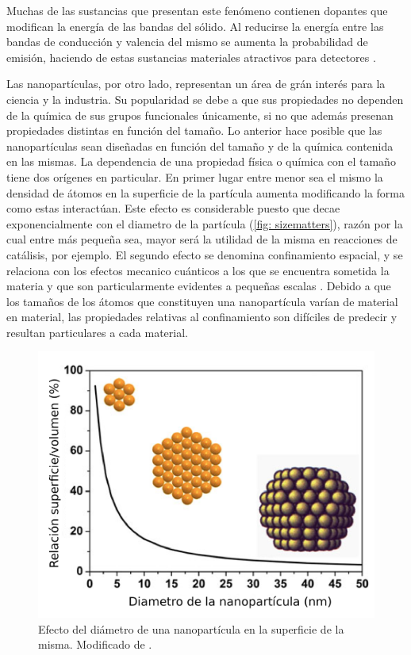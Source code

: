 \documentclass[fleqn,10pt]{SelfArx}
\begin{document}
Muchas de las sustancias que presentan este fen\'omeno contienen dopantes que modifican la energ\'ia de las bandas del s\'olido. Al reducirse la energ\'ia entre las bandas de conducci\'on y valencia del mismo se aumenta la probabilidad de emisi\'on, haciendo de estas sustancias materiales atractivos para detectores \cite{sage_humberstone_oswald_lloyd_bourhill_2001} \cite{olawale_okoli_fontenot_hollerman_2016}.

Las nanopart\'iculas, por otro lado, representan un \'area de gr\'an inter\'es para la ciencia y la industria. Su popularidad se debe a que sus propiedades no dependen de la qu\'imica de sus grupos funcionales \'unicamente, si no que adem\'as presenan propiedades distintas en funci\'on del tama\~no. Lo anterior hace posible que las nanopart\'iculas sean dise\~nadas en funci\'on del tama\~no y de la qu\'imica contenida en las mismas. La dependencia de una propiedad f\'isica o qu\'imica con el tama\~no tiene dos or\'igenes en particular. En primer lugar entre menor sea el mismo la densidad de \'atomos en la superficie de la part\'icula aumenta modificando la forma como estas interact\'uan. Este efecto es considerable puesto que decae exponencialmente con el diametro de la part\'icula (\autoref{fig: sizematters}), raz\'on por la cual entre m\'as peque\~na sea, mayor ser\'a la utilidad de la misma en reacciones de cat\'alisis, por ejemplo. El segundo efecto se denomina confinamiento espacial, y se relaciona con los efectos mecanico cu\'anticos a los que se encuentra sometida la materia y que son particularmente evidentes a peque\~nas escalas \cite{de_mello_donega_2014}. Debido a que los tama\~nos de los \'atomos que constituyen una nanopart\'icula var\'ian de material en material, las propiedades relativas al confinamiento son dif\'iciles de predecir y resultan particulares a cada material.
\begin{figure}[h]
	\centering
	\includegraphics[width=0.8\linewidth]{Structures/nanosizes.png}
	\caption{Efecto del di\'ametro de una nanopart\'icula en la superficie de la misma. Modificado de \cite{de_mello_donega_2014}.}
	\label{fig: sizematters}
\end{figure}
\end{document}
